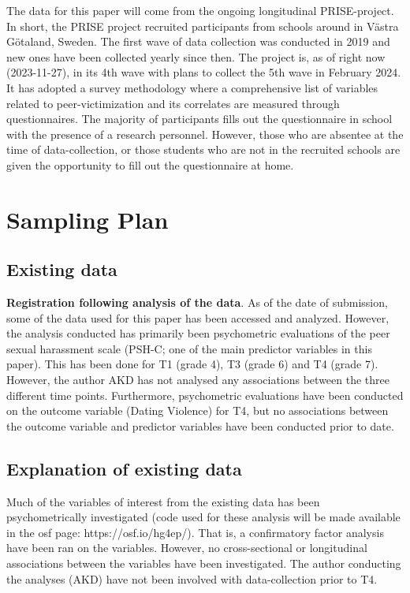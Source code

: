\documentclass[
]{article}
\begin{document}
The data for this paper will come from the ongoing longitudinal
PRISE-project. In short, the PRISE project recruited participants from
schools around in Västra Götaland, Sweden. The first wave of data
collection was conducted in 2019 and new ones have been collected yearly
since then. The project is, as of right now (2023-11-27), in its 4th
wave with plans to collect the 5th wave in February 2024. It has adopted
a survey methodology where a comprehensive list of variables related to
peer-victimization and its correlates are measured through
questionnaires. The majority of participants fills out the questionnaire
in school with the presence of a research personnel. However, those who
are absentee at the time of data-collection, or those students who are
not in the recruited schools are given the opportunity to fill out the
questionnaire at home.

\section{Sampling Plan}\label{sampling-plan}

\subsection{Existing data}\label{existing-data}

\textbf{Registration following analysis of the data}. As of the date of
submission, some of the data used for this paper has been accessed and
analyzed. However, the analysis conducted has primarily been
psychometric evaluations of the peer sexual harassment scale (PSH-C; one
of the main predictor variables in this paper). This has been done for
T1 (grade 4), T3 (grade 6) and T4 (grade 7). However, the author AKD has
not analysed any associations between the three different time points.
Furthermore, psychometric evaluations have been conducted on the outcome
variable (Dating Violence) for T4, but no associations between the
outcome variable and predictor variables have been conducted prior to
date.

\subsection{Explanation of existing
data}\label{explanation-of-existing-data}

Much of the variables of interest from the existing data has been
psychometrically investigated (code used for these analysis will be made
available in the osf page: https://osf.io/hg4ep/). That is, a
confirmatory factor analysis have been ran on the variables. However, no
cross-sectional or longitudinal associations between the variables have
been investigated. The author conducting the analyses (AKD) have not
been involved with data-collection prior to T4.
\end{document}
